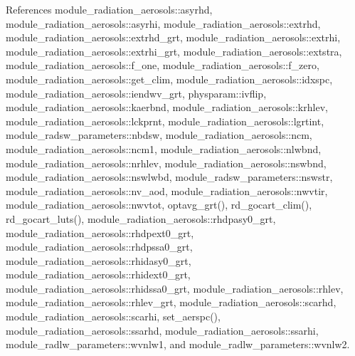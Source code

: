 References module\+\_\+radiation\+\_\+aerosols\+::asyrhd, module\+\_\+radiation\+\_\+aerosols\+::asyrhi, module\+\_\+radiation\+\_\+aerosols\+::extrhd, module\+\_\+radiation\+\_\+aerosols\+::extrhd\+\_\+grt, module\+\_\+radiation\+\_\+aerosols\+::extrhi, module\+\_\+radiation\+\_\+aerosols\+::extrhi\+\_\+grt, module\+\_\+radiation\+\_\+aerosols\+::extstra, module\+\_\+radiation\+\_\+aerosols\+::f\+\_\+one, module\+\_\+radiation\+\_\+aerosols\+::f\+\_\+zero, module\+\_\+radiation\+\_\+aerosols\+::get\+\_\+clim, module\+\_\+radiation\+\_\+aerosols\+::idxspc, module\+\_\+radiation\+\_\+aerosols\+::iendwv\+\_\+grt, physparam\+::ivflip, module\+\_\+radiation\+\_\+aerosols\+::kaerbnd, module\+\_\+radiation\+\_\+aerosols\+::krhlev, module\+\_\+radiation\+\_\+aerosols\+::lckprnt, module\+\_\+radiation\+\_\+aerosols\+::lgrtint, module\+\_\+radsw\+\_\+parameters\+::nbdsw, module\+\_\+radiation\+\_\+aerosols\+::ncm, module\+\_\+radiation\+\_\+aerosols\+::ncm1, module\+\_\+radiation\+\_\+aerosols\+::nlwbnd, module\+\_\+radiation\+\_\+aerosols\+::nrhlev, module\+\_\+radiation\+\_\+aerosols\+::nswbnd, module\+\_\+radiation\+\_\+aerosols\+::nswlwbd, module\+\_\+radsw\+\_\+parameters\+::nswstr, module\+\_\+radiation\+\_\+aerosols\+::nv\+\_\+aod, module\+\_\+radiation\+\_\+aerosols\+::nwvtir, module\+\_\+radiation\+\_\+aerosols\+::nwvtot, optavg\+\_\+grt(), rd\+\_\+gocart\+\_\+clim(), rd\+\_\+gocart\+\_\+luts(), module\+\_\+radiation\+\_\+aerosols\+::rhdpasy0\+\_\+grt, module\+\_\+radiation\+\_\+aerosols\+::rhdpext0\+\_\+grt, module\+\_\+radiation\+\_\+aerosols\+::rhdpssa0\+\_\+grt, module\+\_\+radiation\+\_\+aerosols\+::rhidasy0\+\_\+grt, module\+\_\+radiation\+\_\+aerosols\+::rhidext0\+\_\+grt, module\+\_\+radiation\+\_\+aerosols\+::rhidssa0\+\_\+grt, module\+\_\+radiation\+\_\+aerosols\+::rhlev, module\+\_\+radiation\+\_\+aerosols\+::rhlev\+\_\+grt, module\+\_\+radiation\+\_\+aerosols\+::scarhd, module\+\_\+radiation\+\_\+aerosols\+::scarhi, set\+\_\+aerspc(), module\+\_\+radiation\+\_\+aerosols\+::ssarhd, module\+\_\+radiation\+\_\+aerosols\+::ssarhi, module\+\_\+radlw\+\_\+parameters\+::wvnlw1, and module\+\_\+radlw\+\_\+parameters\+::wvnlw2.



